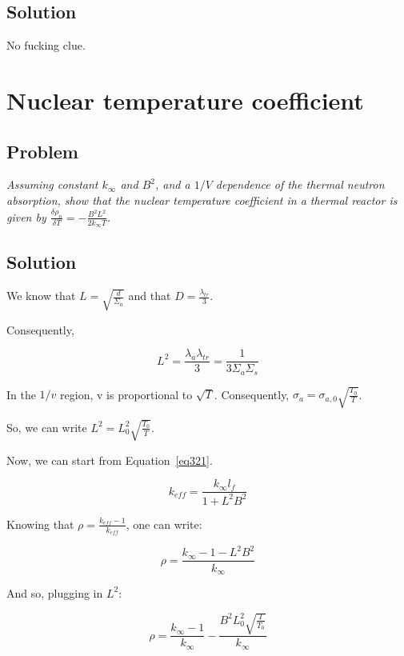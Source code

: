 \subsection{Solution}

No fucking clue.


\section{Nuclear temperature coefficient}
\label{prob35}

\subsection{Problem}
\textit{Assuming constant $k_{\infty}$ and $B^2$, and a $1/V$ dependence of the thermal neutron absorption, show that the nuclear temperature coefficient in a thermal reactor is given by $\frac{\delta\rho_n}{\delta T} = - \frac{B^2 L^2}{2k_{\infty}T}$.}

\subsection{Solution}

We know that $L=\sqrt{\frac{d}{\Sigma_a}}$ and that $D = \frac{\lambda_{tr}}{3}$.

Consequently,

\begin{equation}\label{eq320}
L^2 = \frac{\lambda_a\lambda_{tr}}{3} = \frac{1}{3\Sigma_a\Sigma_s}
\end{equation}

In the $1/v$ region, v is proportional to $\sqrt{T}$. Consequently, $\sigma_a = \sigma_{a,0}\sqrt{\frac{T_0}{T}}$.

So, we can write $L^2 = L_0^2\sqrt{\frac{T_0}{T}}$.

Now, we can start from Equation~\ref{eq321}.


\begin{equation}\label{eq321}
k_{eff} = \frac{k_{\infty} l_f}{1 + L^2B^2}
\end{equation}

Knowing that $\rho = \frac{k_{eff} - 1}{k_{eff}}$, one can write:


\begin{equation}\label{eq322}
\rho = \frac{k_{\infty} - 1 - L^2B^2}{k_{\infty}}
\end{equation}

And so, plugging in $L^2$:


\begin{equation}\label{eq323}
\rho = \frac{k_{\infty} - 1}{k_{\infty}} - \frac{B^2L_0^2\sqrt{\frac{T}{T_0}}}{k_{\infty}}
\end{equation}

